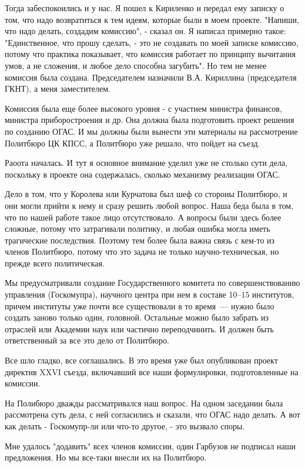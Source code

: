 Тогда забеспокоились и у нас. Я пошел к Кириленко и передал ему записку о том,
что надо возвратиться к тем идеям, которые были в моем проекте. "Напиши, что
надо делать, создадим комиссию", - сказал он. Я написал примерно такое:
"Единственное, что прошу сделать, - это не создавать по моей записке комиссию,
потому что практика показывает, что комиссия работает по принципу вычитания
умов, а не сложения, и любое дело способна загубить". Но тем не менее комиссия
была создана. Председателем назначили В.А. Кириллина (председателя ГКНТ), а меня
заместителем.

Комиссия была еще более высокого уровня - с участием министра финансов, министра
приборостроения и др. Она должна была подготовить проект решения по созданию
ОГАС. И мы должны были вынести эти материалы на рассмотрение Политбюро ЦК КПСС,
а Политбюро уже решало, что пойдет на съезд.

Раоота началась. И тут я основное внимание уделил уже не столько сути дела,
поскольку в проекте она содержалась, сколько механизму реализации ОГАС.

Дело в том, что у Королева или Курчатова был шеф со стороны Политбюро, и они
могли прийти к нему и сразу решить любой вопрос. Наша беда была в том, что по
нашей работе такое лицо отсутствовало. А вопросы были здесь более сложные,
потому что затрагивали политику, и любая ошибка могла иметь трагические
последствия. Поэтому тем более была важна связь с кем-то из членов Политбюро,
потому что это задача не только научно-техническая, но прежде всего
политическая.

Мы предусматривали создание Государственного комитета по совершенствованию
управления (Госкомупра), научного центра при нем в составе 10--15 институтов,
причем институты уже почти все существовали в то время\ --- нужно было создать
заново только один, головной. Остальные можно было забрать из отраслей или
Академии наук или частично переподчинить. И должен быть ответственный за все это
дело от Политбюро.

Все шло гладко, все соглашались. В это время уже был опубликован проект
директив XXVI съезда, включавший все наши формулировки, подготовленные на
комиссии.

На Полибюро дважды рассматривался наш вопрос. На одном заседании была
рассмотрена суть дела, с ней согласились и сказали, что ОГАС надо делать. А вот
как делать - Госкомупр-ли или что-то другое, - это вызвало споры.

Мне удалось "додавить" всех членов комиссии, один Гарбузов не подписал наши
предложения. Но мы все-таки внесли их на Политбюро.


